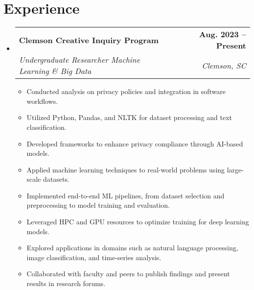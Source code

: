 \documentclass[letterpaper,11pt]{article}
\makeatletter
\newcommand{\resumeSubheading}[4]{
    \vspace{-2pt}\item[]
    \begin{tabular*}{1.0\textwidth}[t]{l@{\extracolsep{\fill}}r}
    \textbf{#1} & \textbf{\small #2} \\
    \textit{\small#3} & \textit{\small #4} \\
    \end{tabular*}\vspace{-7pt}
}
\makeatother
\begin{document}
    \section{Experience}
    \begin{itemize}
        \resumeSubheading{Clemson Creative Inquiry Program}{Aug. 2023 -- Present}{Undergraduate Researcher Machine Learning \& Big Data}{Clemson, SC}
        \begin{itemize}
            \item Conducted analysis on privacy policies and integration in software workflows.
            \item Utilized Python, Pandas, and NLTK for dataset processing and text classification.
            \item Developed frameworks to enhance privacy compliance through AI-based models.
            \item Applied machine learning techniques to real-world problems using large-scale datasets.
            \item Implemented end-to-end ML pipelines, from dataset selection and preprocessing to model training and evaluation.
            \item Leveraged HPC and GPU resources to optimize training for deep learning models.
            \item Explored applications in domains such as natural language processing, image classification, and time-series analysis.
            \item Collaborated with faculty and peers to publish findings and present results in research forums.
        \end{itemize}
    \end{itemize}

\end{document}

